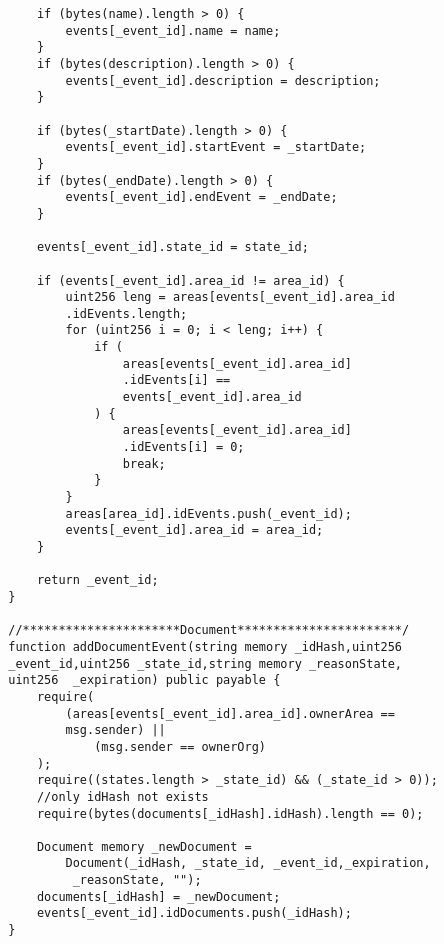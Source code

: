 \begin{verbatim}
            if (bytes(name).length > 0) {
                events[_event_id].name = name;
            }
            if (bytes(description).length > 0) {
                events[_event_id].description = description;
            }
    
            if (bytes(_startDate).length > 0) {
                events[_event_id].startEvent = _startDate;
            }
            if (bytes(_endDate).length > 0) {
                events[_event_id].endEvent = _endDate;
            }
    
            events[_event_id].state_id = state_id;
    
            if (events[_event_id].area_id != area_id) {
                uint256 leng = areas[events[_event_id].area_id
                .idEvents.length;
                for (uint256 i = 0; i < leng; i++) {
                    if (
                        areas[events[_event_id].area_id]
                        .idEvents[i] ==
                        events[_event_id].area_id
                    ) {
                        areas[events[_event_id].area_id]
                        .idEvents[i] = 0;
                        break;
                    }
                }
                areas[area_id].idEvents.push(_event_id);
                events[_event_id].area_id = area_id;
            }
    
            return _event_id;
        }
    
        //**********************Document***********************/
        function addDocumentEvent(string memory _idHash,uint256 
        _event_id,uint256 _state_id,string memory _reasonState,
        uint256  _expiration) public payable {
            require(
                (areas[events[_event_id].area_id].ownerArea == 
                msg.sender) ||
                    (msg.sender == ownerOrg)
            );
            require((states.length > _state_id) && (_state_id > 0));
            //only idHash not exists
            require(bytes(documents[_idHash].idHash).length == 0);
    
            Document memory _newDocument =
                Document(_idHash, _state_id, _event_id,_expiration,
                 _reasonState, "");
            documents[_idHash] = _newDocument;
            events[_event_id].idDocuments.push(_idHash);
        }
    

\end{verbatim}
